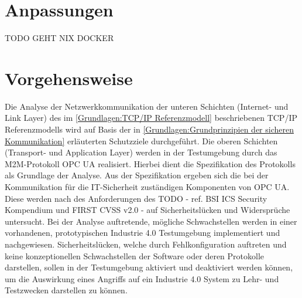 \section{Anpassungen}
\label{Konzept:Anpassungen}
TODO GEHT NIX DOCKER

\section{Vorgehensweise}
Die Analyse der Netzwerkkommunikation der unteren Schichten (Internet- und Link Layer) des im \autoref{Grundlagen:TCP/IP Referenzmodell} beschriebenen TCP/IP Referenzmodells wird auf Basis der in \autoref{Grundlagen:Grundprinzipien der sicheren Kommunikation} erläuterten Schutzziele durchgeführt. Die oberen Schichten (Transport- und Application Layer) werden in der Testumgebung durch das \ac{M2M}-Protokoll \ac{OPC UA} realisiert. Hierbei dient die Spezifikation des Protokolls als Grundlage der Analyse. Aus der Spezifikation ergeben sich die bei der Kommunikation für die IT-Sicherheit zuständigen Komponenten von \ac{OPC UA}. Diese werden nach des Anforderungen des TODO - ref. BSI ICS Security Kompendium und FIRST CVSS v2.0 - auf Sicherheitslücken und Widersprüche untersucht. Bei der Analyse auftretende, mögliche Schwachstellen werden in einer vorhandenen, prototypischen Industrie 4.0 Testumgebung \cite{Weber2018} implementiert und nachgewiesen. Sicherheitslücken, welche durch Fehlkonfiguration auftreten und keine konzeptionellen Schwachstellen der Software oder deren Protokolle darstellen, sollen in der Testumgebung aktiviert und deaktiviert werden können, um die Auswirkung eines Angriffs auf ein Industrie 4.0 System zu Lehr- und Testzwecken darstellen zu können.